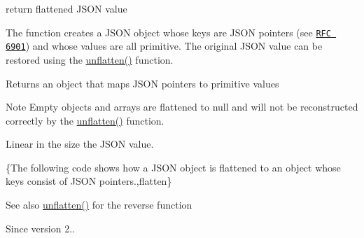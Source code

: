 return flattened J\+S\+ON value 

The function creates a J\+S\+ON object whose keys are J\+S\+ON pointers (see \href{https://tools.ietf.org/html/rfc6901}{\tt R\+FC 6901}) and whose values are all primitive. The original J\+S\+ON value can be restored using the \hyperlink{classnlohmann_1_1basic__json_abb58a0ce5996bd3bc17a3dd954217af6}{unflatten()} function.

\begin{DoxyReturn}{Returns}
an object that maps J\+S\+ON pointers to primitive values
\end{DoxyReturn}
\begin{DoxyNote}{Note}
Empty objects and arrays are flattened to {\ttfamily null} and will not be reconstructed correctly by the \hyperlink{classnlohmann_1_1basic__json_abb58a0ce5996bd3bc17a3dd954217af6}{unflatten()} function.
\end{DoxyNote}
Linear in the size the J\+S\+ON value.

\{The following code shows how a J\+S\+ON object is flattened to an object whose keys consist of J\+S\+ON pointers.,flatten\}

\begin{DoxySeeAlso}{See also}
\hyperlink{classnlohmann_1_1basic__json_abb58a0ce5996bd3bc17a3dd954217af6}{unflatten()} for the reverse function
\end{DoxySeeAlso}
\begin{DoxySince}{Since}
version 2.. 
\end{DoxySince}
